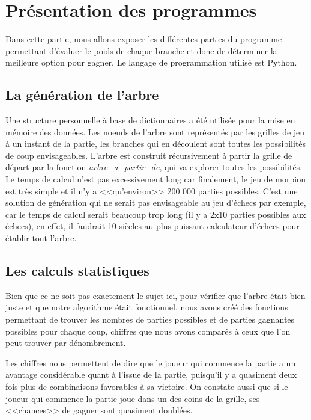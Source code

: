 \documentclass{article}
\begin{document}
\section{Présentation des programmes}

Dans cette partie, nous allons exposer les différentes parties du programme permettant d'évaluer le poids de chaque branche et donc de déterminer la meilleure option pour gagner. Le langage de programmation utilisé est Python.

\subsection{La génération de l'arbre}

Une structure personnelle à base de dictionnaires a été utilisée pour la mise en mémoire des données. Les noeuds de l'arbre sont représentés par les grilles de jeu à un instant de la partie, les branches qui en découlent sont toutes les possibilités de coup envisageables. L'arbre est construit récursivement à partir la grille de départ par la fonction \emph{arbre_a_partir_de}, qui va explorer toutes les possibilités. Le temps de calcul n'est pas excessivement long car finalement, le jeu de morpion est très simple et il n'y a <<qu'environ>> 200 000 parties possibles. C'est une solution de génération qui ne serait pas envisageable au jeu d'échecs par exemple, car le temps de calcul serait beaucoup trop long (il y a 2x10 parties possibles aux échecs), en effet, il faudrait 10 siècles au plus puissant calculateur d'échecs pour établir tout l'arbre.

\subsection{Les calculs statistiques}

Bien que ce ne soit pas exactement le sujet ici, pour vérifier que l'arbre était bien juste et que notre algorithme était fonctionnel, nous avons créé des fonctions permettant de trouver les nombres de parties possibles et de parties gagnantes possibles pour chaque coup, chiffres que nous avons comparés à ceux que l'on peut trouver par dénombrement.


Les chiffres nous permettent de dire que le joueur qui commence la partie a un avantage considérable quant à l'issue de la partie, puisqu'il y a quasiment deux fois plus de combinaisons favorables à sa victoire. On constate aussi que si le joueur qui commence la partie joue dans un des coins de la grille, ses <<chances>> de gagner sont quasiment doublées.
\end{document}

